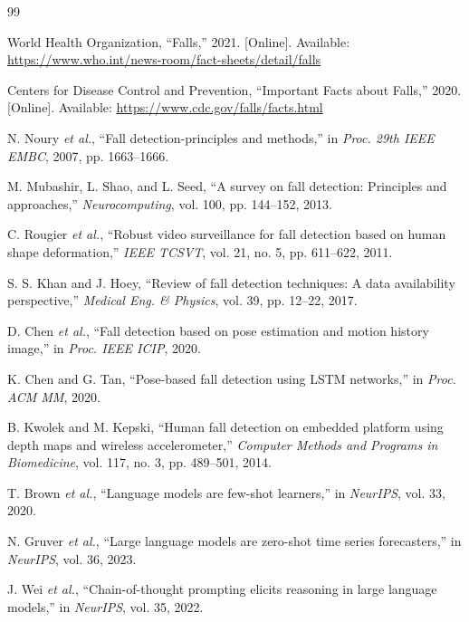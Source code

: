 \documentclass[conference]{IEEEtran}
\begin{document}

\begin{thebibliography}{99}

World Health Organization, ``Falls,'' 2021. [Online]. Available: \url{https://www.who.int/news-room/fact-sheets/detail/falls}

Centers for Disease Control and Prevention, ``Important Facts about Falls,'' 2020. [Online]. Available: \url{https://www.cdc.gov/falls/facts.html}

N. Noury \textit{et al.}, ``Fall detection-principles and methods,'' in \textit{Proc. 29th IEEE EMBC}, 2007, pp. 1663--1666.

M. Mubashir, L. Shao, and L. Seed, ``A survey on fall detection: Principles and approaches,'' \textit{Neurocomputing}, vol. 100, pp. 144--152, 2013.

C. Rougier \textit{et al.}, ``Robust video surveillance for fall detection based on human shape deformation,'' \textit{IEEE TCSVT}, vol. 21, no. 5, pp. 611--622, 2011.

S. S. Khan and J. Hoey, ``Review of fall detection techniques: A data availability perspective,'' \textit{Medical Eng. \& Physics}, vol. 39, pp. 12--22, 2017.

D. Chen \textit{et al.}, ``Fall detection based on pose estimation and motion history image,'' in \textit{Proc. IEEE ICIP}, 2020.

K. Chen and G. Tan, ``Pose-based fall detection using LSTM networks,'' in \textit{Proc. ACM MM}, 2020.

B. Kwolek and M. Kepski, ``Human fall detection on embedded platform using depth maps and wireless accelerometer,'' \textit{Computer Methods and Programs in Biomedicine}, vol. 117, no. 3, pp. 489--501, 2014.

T. Brown \textit{et al.}, ``Language models are few-shot learners,'' in \textit{NeurIPS}, vol. 33, 2020.

N. Gruver \textit{et al.}, ``Large language models are zero-shot time series forecasters,'' in \textit{NeurIPS}, vol. 36, 2023.

J. Wei \textit{et al.}, ``Chain-of-thought prompting elicits reasoning in large language models,'' in \textit{NeurIPS}, vol. 35, 2022.


\end{thebibliography}
\end{document}
